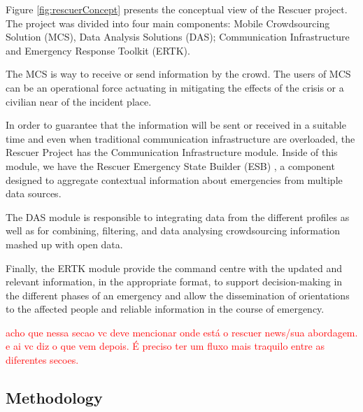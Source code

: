Figure \ref{fig:rescuerConcept} presents the conceptual view of the Rescuer project. The project was divided into four main components: Mobile Crowdsourcing Solution (MCS), Data Analysis Solutions (DAS); Communication Infrastructure and Emergency Response Toolkit (ERTK). 

The MCS \citep{nass2018interaction} is way to receive or send information by the crowd. The users of MCS can be an operational force actuating in mitigating the effects of the crisis or a civilian near of the incident place.

In order to guarantee that the information will be sent or received in a suitable time and even when traditional communication infrastructure are overloaded, the Rescuer Project has the Communication Infrastructure module. Inside of this module, we have the Rescuer Emergency State Builder (ESB) \citep{pereiraetall2017}, a component designed to aggregate contextual information about emergencies from multiple data sources.

The DAS module is responsible to integrating data from the different profiles as well as for combining, filtering, and data analysing \citep{chino2015bowfire} crowdsourcing information mashed up with open data. 

Finally, the ERTK module provide the command centre with the updated and relevant information, in the appropriate format, to support decision-making in the different phases of an emergency and allow the dissemination of orientations to the affected people and reliable information in the course of emergency.

\textcolor{red}{acho que nessa secao vc deve mencionar onde está o rescuer news/sua abordagem. e ai vc diz o que vem depois. É preciso ter um fluxo mais traquilo entre as diferentes secoes.}

\subsection{Methodology}

